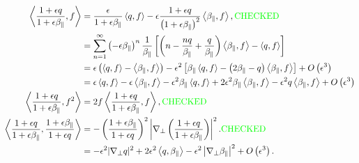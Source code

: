 \documentclass{article}
\newcommand{\para}{\parallel}
\newcommand{\ep}{\epsilon}
\newcommand{\np}{\nabla_\perp}
\newcommand{\fr}{\frac{1+\ep q}{1+\ep\beta_\para}}
\newcommand{\frinv}{\frac{1+\ep\beta_\para}{1+\ep q}}
\newcommand{\pth} [1] {\left( #1 \right) }
\newcommand{\br} [1] {\left[ #1 \right] }
\begin{document}
\begin{align}
    \Braket{\fr, f} &= \frac{\ep}{1+\ep\beta_\para}\Braket{q,f} - \ep\frac{1+\ep q}{\pth{1+\ep\beta_\para}^2} \Braket{\beta_\para,f}, \text{\color{green} CHECKED} \\ 
        &= \sum^\infty_{n=1} \pth{-\ep\beta_\para}^n \frac{1}{\beta_\para} \br{\pth{n - \frac{nq}{\beta_\para} + \frac{q}{\beta_\para}} \Braket{\beta_\para,f} - \Braket{q,f} } \\ 
        &= \ep\pth{\Braket{q,f} - \Braket{\beta_\para,f}} - \ep^2 \br{\beta_\para\Braket{q,f} - \pth{2\beta_\para-q} \Braket{\beta_\para,f}} + O\pth{\ep^3} \\ 
        &= \ep\Braket{q,f} - \ep\Braket{\beta_\para,f} - \ep^2\beta_\para\Braket{q,f} + 2\ep^2\beta_\para\Braket{\beta_\para,f} - \ep^2q\Braket{\beta_\para,f} + O\pth{\ep^3} \\ 
    \Braket{\fr, f^2} &= 2f\Braket{\fr, f}, \text{\color{green} CHECKED} \\ 
    \Braket{\fr, \frinv} &= -\pth{\frinv}^2 \left| \np\pth{\fr} \right|^2. \text{\color{green} CHECKED} \\ 
        &= -\ep^2|\np q|^2 + 2\ep^2\Braket{q,\beta_\para} - \ep^2\left|\np\beta_\para\right|^2 + O\pth{\ep^3}. 
\end{align}
\end{document}
